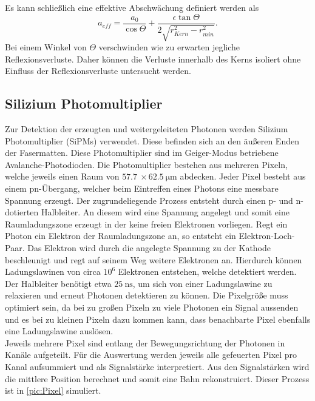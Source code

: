 Es kann schließlich eine effektive Abschwächung definiert werden als
\begin{equation}
    \label{eq:absorption}
    a_{eff} = \frac{a_0}{\cos{\Theta}} + \frac{\epsilon \tan{\Theta}}{2 \sqrt{r^2_{Kern} - r^2_{min}}}.
\end{equation}
Bei einem Winkel von $\Theta$ verschwinden wie zu erwarten jegliche Reflexionsverluste. Daher können die Verluste innerhalb des Kerns
isoliert ohne Einfluss der Reflexionsverluste untersucht werden.

\subsection{Silizium Photomultiplier}

Zur Detektion der erzeugten und weitergeleiteten Photonen werden Silizium Photomultiplier (SiPMs) verwendet. Diese befinden sich an den äußeren 
Enden der Fasermatten. Diese Photomultiplier sind im Geiger-Modus betriebene Avalanche-Photodioden. Die Photomultiplier bestehen aus mehreren 
Pixeln, welche jeweils einen Raum von $\qty{57.7}{} \times \qty{62.5}{\micro\metre}$ abdecken. Jeder Pixel besteht aus einem pn-Übergang, welcher
beim Eintreffen eines Photons eine messbare Spannung erzeugt. Der zugrundeliegende Prozess entsteht durch einen p- und n-dotierten Halbleiter.
An diesem wird eine Spannung angelegt und somit eine Raumladungszone erzeugt in der keine freien Elektronen vorliegen. Regt ein Photon ein Elektron
der Raumladungszone an, so entsteht ein Elektron-Loch-Paar. Das Elektron wird durch die angelegte Spannung zu der Kathode beschleunigt
und regt auf seinem Weg weitere Elektronen an. Hierdurch können Ladungslawinen von circa $10^6$ Elektronen entstehen, welche detektiert werden.\\
Der Halbleiter benötigt etwa $\qty{25}{\nano\second}$, um sich von einer Ladungslawine zu relaxieren und erneut Photonen detektieren zu können.
Die Pixelgröße muss optimiert sein, da bei zu großen Pixeln zu viele Photonen ein Signal aussenden und es bei zu kleinen Pixeln dazu kommen kann,
dass benachbarte Pixel ebenfalls eine Ladungslawine auslösen.\\
Jeweils mehrere Pixel sind entlang der Bewegungsrichtung der Photonen in Kanäle aufgeteilt. Für die Auswertung werden jeweils alle gefeuerten Pixel
pro Kanal aufsummiert und als Signalstärke interpretiert. Aus den Signalstärken wird die mittlere Position berechnet und somit eine Bahn rekonstruiert.
Dieser Prozess ist in \autoref{pic:Pixel} simuliert. \\

